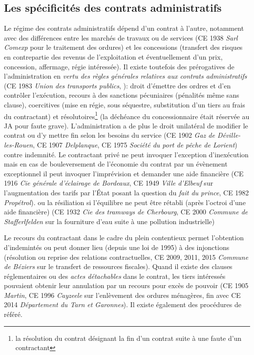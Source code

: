 \documentclass[math]{cours}
\begin{document}
\subsection{Les spécificités des contrats administratifs}
Le régime des contrats administratifs dépend d'un contrat à l'autre, notamment avec des différences entre les marchés de travaux ou de services (CE 1938 \emph{Sarl Comexp} pour le traitement des ordures) et les concessions (transfert des risques en contrepartie des revenus de l'exploitation et éventuellement d'un prix, concession, affermage, régie intéressée).
Il existe toutefois des prérogatives de l'administration en \emph{vertu des règles générales relatives aux contrats administratifs} (CE 1983 \emph{Union des transports publics}, ): droit d'émettre des ordres et d'en contrôler l'exécution,
recours à des sanctions pécuniaires (pénalités même sans clause), coercitives (mise en régie, sous séquestre, substitution d'un tiers au frais du contractant) et résolutoires\footnote{la résolution du contrat désignant la fin d'un contrat suite à une faute d'un contractant} (la déchéance du concessionnaire était réservée au JA pour faute grave).
L'administration a de plus le droit unilatéral de modifier le contrat ou d'y mettre fin selon les besoins du service (CE 1902 \emph{Gaz de Déville-les-Rouen}, CE 1907 \emph{Delplanque}, CE 1975 \emph{Société du port de pêche de Lorient}) contre indemnité.
Le contractant privé ne peut invoquer l'exception d'inexécution mais en cas de bouleversement de l'économie du contrat par un évènement exceptionnel il peut invoquer l'imprévision et demander une aide financière
(CE 1916 \emph{Cie générale d'éclairage de Bordeaux}, CE 1949 \emph{Ville d'Elbeuf} sur l'augmentation des tarifs par l'État posant la question du \emph{fait du prince}, CE 1982 \emph{Propétrol}).
ou la résiliation si l'équilibre ne peut être rétabli (après l'octroi d'une aide financière) (CE 1932 \emph{Cie des tramways de Cherbourg}, CE 2000 \emph{Commune de Stafferlfelden} sur la fourniture d'eau suite à une pollution industrielle)

Le recours du contractant dans le cadre du plein contentieux permet l'obtention d'indemintés ou peut donner lieu (depuis une loi de 1995) à des injonctions (résolution ou reprise des relations contractuelles, CE 2009, 2011, 2015 \emph{Commune de Béziers} sur le transfert de ressources fiscales).
Quand il existe des clauses réglementaires ou des \emph{actes détachables} dans le contrat, les tiers intéressés pouvaient obtenir leur annulation par un recours pour excès de pouvoir (CE 1905 \emph{Martin}, CE 1996 \emph{Cayzeele} sur l'enlèvement des ordures ménagères, fin avec CE 2014 \emph{Département du Tarn et Garonnes}).
Il existe également des procédures de référé.
\end{document}
